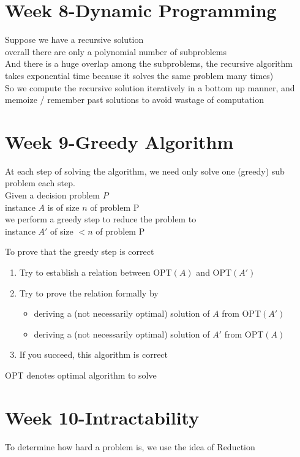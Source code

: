 \documentclass{article}
\begin{document}
\begin{multicols*}{4}
\section{Week 8-Dynamic Programming}
Suppose we have a recursive solution\\
overall there are only a polynomial number of subproblems\\
And there is a huge overlap among the subproblems, the recursive algorithm takes exponential time because it solves the same problem many times)\\
So we compute the recursive solution iteratively in a bottom up manner, and memoize / remember past solutions to avoid wastage of computation 

\section{Week 9-Greedy Algorithm}
At each step of solving the algorithm, we need only solve one (greedy) sub problem each step.\\

Given a decision problem $P$\\
instance $A$ is of size $n$ of problem P\\
we perform a greedy step to reduce the problem to\\
instance $A'$ of size $<n$ of problem P

To prove that the greedy step is correct
\begin{enumerate}
	\item Try to establish a relation between OPT$(A)$ and OPT$(A')$
	\item Try to prove the relation formally by
		\begin{itemize}
			\item deriving a (not necessarily optimal) solution of $A$ from OPT$(A')$
			\item deriving a (not necessarily optimal) solution of $A'$ from OPT$(A)$
		\end{itemize}
	\item If you succeed, this algorithm is correct
\end{enumerate}
OPT denotes optimal algorithm to solve

\section{Week 10-Intractability}
To determine how hard a problem is, we use the idea of Reduction


\end{multicols*}
\end{document}

